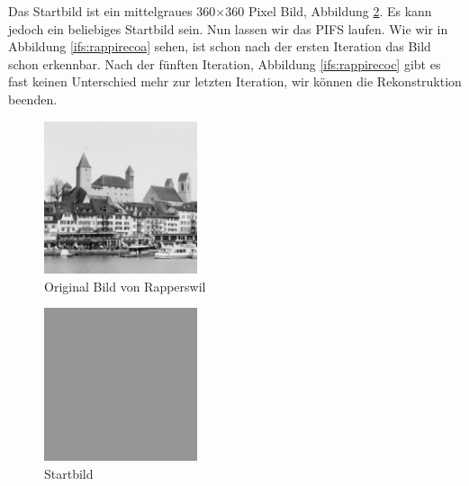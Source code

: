 Das Startbild ist ein mittelgraues 360$\times$360 Pixel Bild, Abbildung \ref{ifs:bild0}.
Es kann jedoch ein beliebiges Startbild sein.
Nun lassen wir das PIFS laufen.
Wie wir in Abbildung \ref{ifs:rappirecoa} sehen, ist schon nach der ersten Iteration das Bild schon erkennbar.
Nach der fünften Iteration, Abbildung \ref{ifs:rappirecoc} gibt es fast keinen Unterschied mehr zur letzten Iteration, wir können die Rekonstruktion beenden.
\begin{figure}	
	\centering
	\includegraphics[width=0.4\textwidth]{papers/ifs/images/original}
	\caption{Original Bild von Rapperswil}
	\label{ifs:original}
\end{figure}
\begin{figure}
	\centering
	\includegraphics[width=0.4\textwidth]{papers/ifs/images/rapperswil}
	\caption{Startbild}
	\label{ifs:bild0}
\end{figure}

